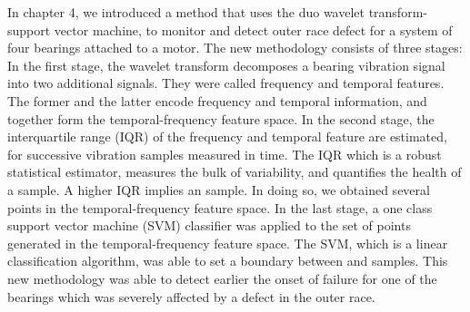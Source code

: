 \documentclass[thesis.tex]{subfiles}
\begin{document}
	\justify
	In chapter 4, we introduced a method that uses the duo wavelet transform-support vector machine, to monitor and detect outer race defect for a system of four bearings attached to a motor. The new methodology consists of three stages: In the first stage, the wavelet transform decomposes a bearing vibration signal into two additional signals. They were called frequency and temporal features. The former and the latter encode frequency and temporal information, and together form the temporal-frequency feature space. In the second stage, the interquartile range (IQR) of the frequency and temporal feature are estimated, for successive vibration samples measured in time. The IQR which is a robust statistical estimator, measures the bulk of variability, and quantifies the health of a sample. A higher IQR implies an  sample. In doing so, we obtained several points in the temporal-frequency feature space.
	\justify
	In the last stage, a one class support vector machine (SVM) classifier was applied to the set of points generated in the temporal-frequency feature space. The SVM, which is a linear classification algorithm, was able to set a boundary between  and  samples.
	This new methodology was able to detect earlier the onset of failure for one of the bearings which was severely affected by a defect in the outer race.
	
	
	
\end{document}
